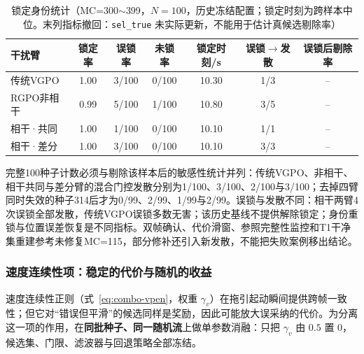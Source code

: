 \documentclass[UTF8,a4paper,zihao=-4]{ctexart}
\begin{document}
\begin{table}[htbp]
\centering
\caption{锁定身份统计（MC=300$\sim$399，$N=100$，历史冻结配置；锁定时刻为跨样本中位。末列指标撤回：\texttt{sel\_true} 未实际更新，不能用于估计真候选剔除率）}\label{tab:lock}
\small
\begin{tabular}{@{}lcccccc@{}}
\toprule
干扰臂 & 锁定率 & 误锁率 & 未锁率 & 锁定时刻/s & 误锁$\to$发散 & 误锁后剔除率\\
\midrule
传统VGPO & 1.00 & 3/100 & 0/100 & 10.30 & 1/3 & --\\
RGPO非相干 & 0.99 & 5/100 & 1/100 & 10.80 & 3/5 & --\\
相干·共同 & 1.00 & 1/100 & 0/100 & 10.10 & 1/1 & --\\
相干·差分 & 1.00 & 3/100 & 0/100 & 10.10 & 3/3 & --\\
\bottomrule
\end{tabular}
\end{table}

完整100种子计数必须与剔除该样本后的敏感性统计并列：传统VGPO、非相干、相干共同与差分臂的混合门控发散分别为1/100、3/100、2/100与3/100；去掉四臂同时失效的种子314后才为0/99、2/99、1/99与2/99。误锁与发散不同：相干两臂4次误锁全部发散，传统VGPO误锁多数无害；该历史基线不提供解除锁定；身份重锁与位置误差恢复是不同指标。双帧确认、代价滑窗、参照完整性监控和T1干净集重建参考未修复MC=115，部分修补还引入新发散，不能把失败案例移出结论。



\subsubsection{速度连续性项：稳定的代价与随机的收益}\label{sec:vel-term}

速度连续性正则（式~\eqref{eq:combo-vpen}，权重 $\gamma_v$）在拖引起动瞬间提供跨帧一致性；但它对“错误但平滑”的候选同样是奖励，因此可能放大误采纳的代价。为分离这一项的作用，在\textbf{同批种子、同一随机流}上做单参数消融：只把 $\gamma_v$ 由 $0.5$ 置 $0$，候选集、门限、滤波器与回退策略全部冻结。

\begin{table}[htbp]
\centering
\caption{速度连续性项的单参数消融（同批种子配对；位置 RMSE，m；发散判据 \(>50\)~m）}\label{tab:vel}
\small
{}
\end{table}
\end{document}
